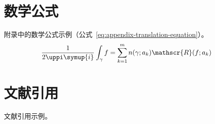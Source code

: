 \begin{translation}
\section{数学公式}

附录中的数学公式示例（公式~\eqref{eq:appendix-translation-equation}）。
\begin{equation}
  \frac{1}{2 \uppi \symup{i}} \int_\gamma f = \sum_{k=1}^m n(\gamma; a_k) \mathscr{R}(f; a_k)
  \label{eq:appendix-translation-equation}
\end{equation}


\section{文献引用}

文献引用示例\cite{abrahams99tex}。





\begin{translation-index}
  \nocite{salomon1995advanced}
  
  
\end{translation-index}

\end{translation}
